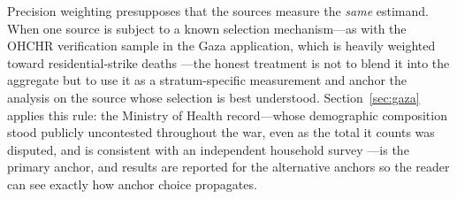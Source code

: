 Precision weighting presupposes that the sources measure the \emph{same} estimand. When one source is subject to a known selection mechanism---as with the OHCHR verification sample in the Gaza application, which is heavily weighted toward residential-strike deaths \citep{spagatcockerill2024}---the honest treatment is not to blend it into the aggregate but to use it as a stratum-specific measurement and anchor the analysis on the source whose selection is best understood. Section~\ref{sec:gaza} applies this rule: the Ministry of Health record---whose demographic composition stood publicly uncontested throughout the war, even as the total it counts was disputed, and is consistent with an independent household survey \citep{spagatlgh2026}---is the primary anchor, and results are reported for the alternative anchors so the reader can see exactly how anchor choice propagates.
